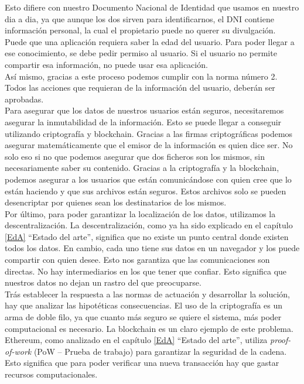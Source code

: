 Esto difiere con nuestro Documento Nacional de Identidad que usamos en nuestro dia a dia, ya que aunque los dos sirven para identificarnos, el DNI contiene información personal, la cual el propietario puede no querer su divulgación. Puede que una aplicación requiera saber la edad del usuario. Para poder llegar a ese conocimiento, se debe pedir permiso al usuario. Si el usuario no permite compartir esa información, no puede usar esa aplicación.\\
 Así mismo, gracias a este proceso podemos cumplir con la norma número 2. Todos las acciones que requieran de la información del usuario, deberán ser aprobadas.\\
 Para asegurar que los datos de nuestros usuarios están seguros, necesitaremos asegurar la inmutabilidad de la información. Esto se puede llegar a conseguir utilizando criptografía y blockchain. Gracias a las firmas criptográficas podemos asegurar matemáticamente que el emisor de la información es quien dice ser. No solo eso si no que podemos asegurar que dos ficheros son los mismos, sin necesariamente saber su contenido. Gracias a la criptografía y la blockchain, podemos asegurar a los usuarios que están comunicándose con quien cree que lo están haciendo y que sus archivos están seguros. Estos archivos solo se pueden desencriptar por quienes sean los destinatarios de los mismos. \\
 Por último, para poder garantizar la localización de los datos, utilizamos la descentralización. La descentralización, como ya ha sido explicado en el capítulo \ref{EdA} “Estado del arte”, significa que no existe un punto central  donde existen todos los datos. En cambio, cada uno tiene sus datos en un navegador y los puede compartir con quien desee. Esto nos garantiza que las comunicaciones son directas. No hay intermediarios en los que tener que confiar. Esto significa que nuestros datos no dejan un rastro del que preocuparse.\\
 Trás establecer la respuesta a las normas de actuación y desarrollar la solución, hay que analizar las hipotéticas consecuencias. El uso de la criptografía es un arma de doble filo, ya que cuanto más seguro se quiere el sistema, más poder computacional es necesario. La blockchain es un claro ejemplo de este problema. Ethereum, como analizado en el capítulo \ref{EdA} “Estado del arte”, utiliza \textit{proof-of-work} (PoW – Prueba de trabajo) para garantizar la seguridad de la cadena. Esto significa que para poder verificar una nueva transacción hay que gastar recursos computacionales. \\
